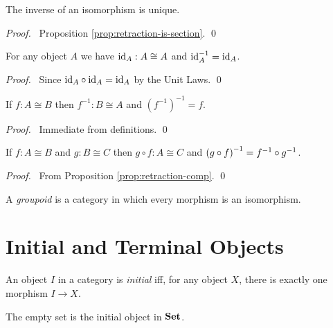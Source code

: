 \begin{prop}
    \label{prop:inv-unique}
    The inverse of an isomorphism is unique.
\end{prop}

\begin{proof}
    \pf\ Proposition \ref{prop:retraction-is-section}. \qed
\end{proof}

\begin{prop}
    For any object $A$ we have $\mathrm{id}_{A} : A \cong A$ and $\mathrm{id}_{A}^{-1} = \mathrm{id}_{A}$.
\end{prop}

\begin{proof}
    \pf\ Since $\mathrm{id}_{A} \circ \mathrm{id}_{A} = \mathrm{id}_{A}$ by the Unit Laws. \qed
\end{proof}

\begin{prop}
    If $f : A \cong B$ then $f^{-1} : B \cong A$ and $(f^{-1})^{-1} = f$.
\end{prop}

\begin{proof}
    \pf\ Immediate from definitions. \qed
\end{proof}

\begin{prop}
    If $f : A \cong B$ and $g : B \cong C$ then $g \circ f : A \cong C$ and ${(g \circ f)}^{-1} = {f}^{-1} \circ {g}^{-1}$.
\end{prop}

\begin{proof}
    \pf\ From Proposition \ref{prop:retraction-comp}. \qed
\end{proof}

\begin{df}[Groupoid]
    A \emph{groupoid} is a category in which every morphism is an isomorphism.
\end{df}

\section{Initial and Terminal Objects}

\begin{df}
    An object $I$ in a category is \emph{initial} iff, for any object $X$, there is exactly one morphism $I \rightarrow X$.
\end{df}

\begin{ex}
    The empty set is the initial object in $\mathbf{Set}$.
\end{ex}

